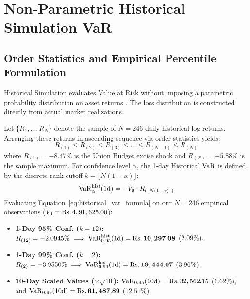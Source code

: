 
\section{Non-Parametric Historical Simulation VaR}
\label{sec:historical_simulation_var}

\subsection{Order Statistics and Empirical Percentile Formulation}

Historical Simulation evaluates Value at Risk without imposing a parametric probability distribution on asset returns \citep{beder1995var}. The loss distribution is constructed directly from actual market realizations.

Let $\{R_1, \dots, R_N\}$ denote the sample of $N = 246$ daily historical log returns. Arranging these returns in ascending sequence via order statistics yields:
\begin{equation}
    R_{(1)} \le R_{(2)} \le R_{(3)} \le \dots \le R_{(N-1)} \le R_{(N)}
    \label{eq:order_statistics}
\end{equation}
where $R_{(1)} = -8.47\%$ is the Union Budget excise shock and $R_{(N)} = +5.88\%$ is the sample maximum. For confidence level $\alpha$, the 1-day Historical $\operatorname{VaR}$ is defined by the discrete rank cutoff $k = \lfloor N(1-\alpha) \rfloor$:
\begin{equation}
    \operatorname{VaR}_{\alpha}^{\text{hist}}(1\text{d}) = -V_0 \cdot R_{(\lfloor N(1-\alpha) \rfloor)}
    \label{eq:historical_var_formula}
\end{equation}
Evaluating Equation~\eqref{eq:historical_var_formula} on our $N = 246$ empirical observations ($V_0 = \text{\text{Rs.}\,}4,91,625.00$):
\begin{itemize}[leftmargin=1.2em, itemsep=0.5pt, parsep=0pt]
    \item \textbf{1-Day 95\% Conf. ($k=12$):} $R_{(12)} = -2.0945\% \implies \operatorname{VaR}_{0.95}^{\text{hist}}(1\text{d}) = \mathbf{\text{\text{Rs.}\,}10,297.08}$ ($2.09\%$).
    \item \textbf{1-Day 99\% Conf. ($k=2$):} $R_{(2)} = -3.9550\% \implies \operatorname{VaR}_{0.99}^{\text{hist}}(1\text{d}) = \mathbf{\text{\text{Rs.}\,}19,444.07}$ ($3.96\%$).
    \item \textbf{10-Day Scaled Values ($\times \sqrt{10}$):} $\operatorname{VaR}_{0.95}(10\text{d}) = \text{\text{Rs.}\,}32,562.15$ ($6.62\%$), and $\operatorname{VaR}_{0.99}(10\text{d}) = \mathbf{\text{\text{Rs.}\,}61,487.89}$ ($12.51\%$).
\end{itemize}

